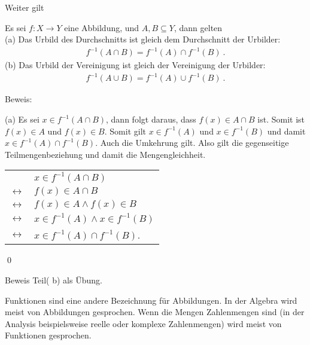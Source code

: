 \begin{Unit}[Bemerkung]
Weiter gilt

\begin{Bemerkung}
  Es sei $f: X \rightarrow Y$ eine Abbildung, und $A, B \subseteq Y$, dann 
  gelten \\
  (a) Das Urbild des Durchschnitts ist gleich dem Durchschnitt der Urbilder:
    \begin{align}
      f^{-1} (A \cap B) = f^{-1} (A) \cap f^{-1} (B) \ .
    \end{align}
  (b) Das Urbild der Vereinigung ist gleich der Vereinigung der Urbilder:
    \begin{align}
      f^{-1} (A \cup B) = f^{-1} (A) \cup f^{-1} (B) \ .
    \end{align}
\end{Bemerkung}

Beweis: 

(a) Es sei $x \in f^{-1}(A \cap B)$, dann folgt daraus, dass $f(x) 
\in A \cap B$ ist. Somit ist $f(x) \in A$ und $f(x) \in B$. Somit gilt 
$x \in f^{-1}(A)$ und $x \in f^{-1}(B)$ und damit $x \in f^{-1}(A) 
\cap f^{-1}(B)$. Auch die Umkehrung gilt. Also gilt die gegenseitige
Teilmengenbeziehung und damit die Mengengleichheit. 

\begin{tabular}{l l}
  & $x \in f^{-1} (A \cap B)$ \\
  $\leftrightarrow$ & $f(x) \in A \cap B$ \\
  $\leftrightarrow$ & $f(x) \in A\land f(x) \in B$ \\
  $\leftrightarrow$ & $x \in f^{-1}(A) \land x \in f^{-1}(B)$ \\
  $\leftrightarrow$ & $x \in f^{-1}(A) \cap f^{-1}(B)$. 
\end{tabular} \qed

Beweis Teil( b) als Übung. 
\end{Unit}

\begin{Unit}
Funktionen sind eine andere Bezeichnung für Abbildungen. In der Algebra wird 
meist von Abbildungen gesprochen. Wenn die Mengen Zahlenmengen sind (in der 
Analysis beispielsweise reelle oder komplexe Zahlenmengen) wird meist von 
Funktionen gesprochen. 
\end{Unit} 


